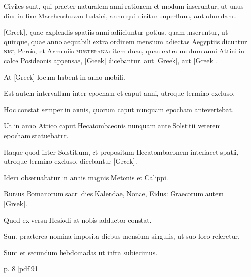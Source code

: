 Civiles sunt,
qui praeter naturalem anni rationem et modum inseruntur, ut unus
dies in fine Marcheschuvan Iudaici, anno qui dicitur superfluus, aut
abundans.

\textgreek{[Greek]}, quae explendis spatiis anni adiiciuntur potius,
quam inseruntur, ut quinque, quae anno aequabili extra ordinem mensium
adiectae Aegyptiis dicuntur \textsc{nisi}, Persis, et Armeniis \textsc{musteraka}: 
item duae, quae extra modum anni Attici in calce Posideonis
appensae, \textgreek{[Greek]} dicebantur,
 aut \textgreek{[Greek]}, aut \textgreek{[Greek]}.

At \textgreek{[Greek]} locum habent in anno mobili.

Est autem intervallum
inter epocham et caput anni, utroque termino excluso.

Hoc
constat semper in annis, quorum caput nunquam epocham antevertebat.

Ut in anno Attico caput Hecatombaeonis nunquam ante Solstitii
veterem epocham statuebatur.

Itaque quod inter Solstitium, et
propositum Hecatombaeonem interiacet spatii, utroque termino excluso,
dicebantur \textgreek{[Greek]}.

Idem obseruabatur in annis magnis
Metonis et Calippi.

Rursus Romanorum sacri dies Kalendae, Nonae,
Eidus: Graecorum autem \textgreek{[Greek]}.

Quod ex versu Hesiodi at
nobis adductor constat.

Sunt praeterea nomina imposita diebus mensium
singulis, ut suo loco referetur.

Sunt et secundum hebdomadas
ut infra subiecimus.

p. 8 [pdf 91]


